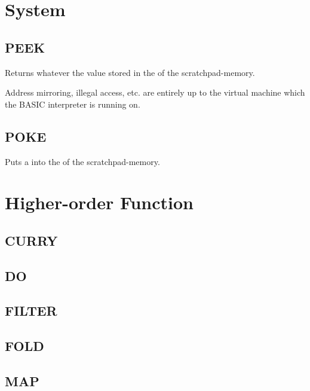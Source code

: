 \section{System}

    \subsection{PEEK}
        \par
        Returns whatever the value stored in the  of the scratchpad-memory.\par
        Address mirroring, illegal access, etc. are entirely up to the virtual machine which the BASIC interpreter is running on.
    \subsection{POKE}
        \par
        Puts a  into the  of the scratchpad-memory.

\section{Higher-order Function}

    \subsection{CURRY}
    \subsection{DO}
    \subsection{FILTER}
    \subsection{FOLD}
    \subsection{MAP}
